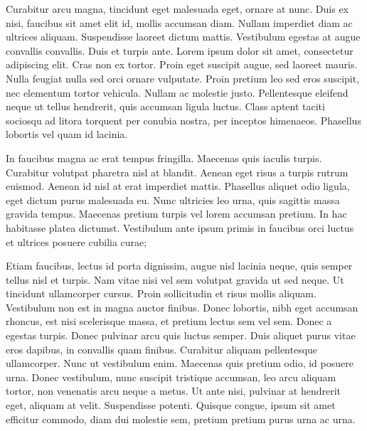 \documentclass{book}
\begin{document}
            Curabitur arcu magna, tincidunt eget malesuada eget, ornare at nunc. Duis ex nisi,
               faucibus sit amet elit id, mollis accumsan diam. Nullam imperdiet diam ac ultrices
               aliquam. Suspendisse laoreet dictum mattis. Vestibulum egestas at augue convallis
               convallis. Duis et turpis ante. Lorem ipsum dolor sit amet, consectetur adipiscing
               elit. Cras non ex tortor. Proin eget suscipit augue, sed laoreet mauris. Nulla
               feugiat nulla sed orci ornare vulputate. Proin pretium leo sed eros suscipit, nec
               elementum tortor vehicula. Nullam ac molestie justo. Pellentesque eleifend neque ut
               tellus hendrerit, quis accumsan ligula luctus. Class aptent taciti sociosqu ad litora
               torquent per conubia nostra, per inceptos himenaeos. Phasellus lobortis vel quam id
               lacinia.
            
            In faucibus magna ac erat tempus fringilla. Maecenas quis iaculis turpis. Curabitur
               volutpat pharetra nisl at blandit. Aenean eget risus a turpis rutrum euismod. Aenean
               id nisl at erat imperdiet mattis. Phasellus aliquet odio ligula, eget dictum purus
               malesuada eu. Nunc ultricies leo urna, quis sagittis massa gravida tempus. Maecenas
               pretium turpis vel lorem accumsan pretium. In hac habitasse platea dictumst.
               Vestibulum ante ipsum primis in faucibus orci luctus et ultrices posuere cubilia
               curae;
            
            Etiam faucibus, lectus id porta dignissim, augue nisl lacinia neque, quis semper
               tellus nisl et turpis. Nam vitae nisi vel sem volutpat gravida ut sed neque. Ut
               tincidunt ullamcorper cursus. Proin sollicitudin et risus mollis aliquam. Vestibulum
               non est in magna auctor finibus. Donec lobortis, nibh eget accumsan rhoncus, est nisi
               scelerisque massa, et pretium lectus sem vel sem. Donec a egestas turpis. Donec
               pulvinar arcu quis luctus semper. Duis aliquet purus vitae eros dapibus, in convallis
               quam finibus. Curabitur aliquam pellentesque ullamcorper. Nunc ut vestibulum enim.
               Maecenas quis pretium odio, id posuere urna. Donec vestibulum, nunc suscipit
               tristique accumsan, leo arcu aliquam tortor, non venenatis arcu neque a metus. Ut
               ante nisi, pulvinar at hendrerit eget, aliquam at velit. Suspendisse potenti. Quisque
               congue, ipsum sit amet efficitur commodo, diam dui molestie sem, pretium pretium
               purus urna ac urna.
            
\end{document}

